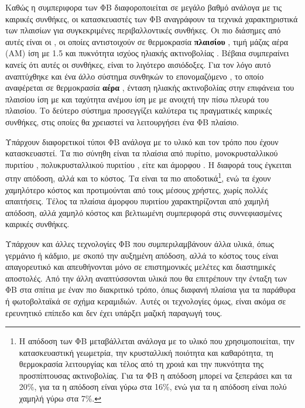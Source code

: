 \documentclass[12pt]{report}
\begin{document}
Καθώς η συμπεριφορα των ΦΒ διαφοροποιείται σε μεγάλο βαθμό ανάλογα με τις καιρικές συνθήκες, οι κατασκευαστές των ΦΒ αναγράφουν τα τεχνικά χαρακτηριστικά των πλαισίων για συγκεκριμένες περιβαλλοντικές συνθήκες. Οι πιο διάσημες
από αυτές είναι οι {}, οι οποίες αντιστοιχούν σε θερμοκρασία \textbf{πλαισίου} {}, τιμή μάζας αέρα (ΑΜ) ίση με 1.5 και πυκνότητα ισχύος ηλιακής ακτινοβολίας 
{}. Βέβαια συμπεραίνει κανείς ότι αυτές οι συνθήκες, είναι το λιγότερο αισιόδοξες. Για τον λόγο αυτό αναπτύχθηκε και ένα άλλο σύστημα συνθηκών το επονομαζόμενο 
{}, το οποίο αναφέρεται σε θερμοκρασία \textbf{αέρα} {}, ένταση ηλιακής ακτινοβολίας στην επιφάνεια του πλαισίου ίση με {} 
και ταχύτητα ανέμου ίση με {} με ανοιχτή την πίσω πλευρά του πλαισίου. Το δεύτερο σύστημα προσεγγίζει καλύτερα τις πραγματικές καιρικές συνθήκες, στις οποίες θα χρειαστεί να λειτουργήσει ένα ΦΒ πλαίσιο. 

Υπάρχουν διαφορετικοί τύποι ΦΒ ανάλογα με το υλικό και τον τρόπο που έχουν κατασκευαστεί. Τα πιο σύνηθη είναι τα πλαίσια από πυρίτιο, μονοκρυσταλλικού πυριτίου {}, πολυκρυσταλλικού πυριτίου 
{}, είτε και άμορφου {}. Η διαφορά τους έγκειται στην απόδοση, αλλά και το κόστος. Τα {} είναι τα πιο αποδοτικά\footnote{Η απόδοση των ΦΒ μεταβάλλεται ανάλογα με το 
υλικό που χρησιμοποιείται, την κατασκευαστική γεωμετρία, την κρυσταλλική ποιότητα και καθαρότητα, τη θερμοκρασία λειτουργίας και τέλος από τη χροιά και την πυκνότητα της προσπίπτουσας ακτινοβολίας. Για τα {}
ΦΒ η απόδοση μπορεί να ξεπεράσει και τα 20\%, για τα {} η απόδοση είναι γύρω στα 16\%, ενώ για τα {} η απόδοση είναι πολύ χαμηλή γύρω στα 7\%.}, ενώ τα {} έχουν χαμηλότερο
κόστος και προτιμούνται από τους μέσους χρήστες, χωρίς πολλές απαιτήσεις. Τέλος τα πλαίσια άμορφου πυριτίου χαρακτηρίζονται από χαμηλή απόδοση, αλλά χαμηλό κόστος και βελτιωμένη συμπεριφορά στις συννεφιασμένες καιρικές συνθήκες.

Υπάρχουν και άλλες τεχνολογίες ΦΒ που συμπεριλαμβάνουν άλλα υλικά, όπως γερμάνιο ή κάδμιο, με σκοπό την αυξημένη απόδοση, αλλά το κόστος τους είναι απαγορευτικό και απευθήνονται μόνο σε επιστημονικές μελέτες και διαστημικές
αποστολές. Από την άλλη αναπτύσσονται υλικά που θα επιτρέπουν την ένταξη των ΦΒ στα σπίτια με έναν πιο διακριτικό τρόπο, όπως διαφανή πλαίσια για τα παράθυρα ή φωτοβολταϊκά σε σχήμα κεραμιδιών. Αυτές οι τεχνολογίες όμως, είναι
ακόμα σε ερευνητικό επίπεδο και δεν έχει υπάρξει μαζική παραγωγή τους.
\end{document}
